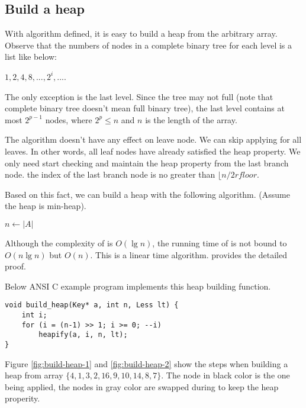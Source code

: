 \documentclass{article}
\begin{document}
\subsection{Build a heap}

With  algorithm defined, it is easy to build a heap from the arbitrary
array. Observe that the numbers of nodes in a complete binary tree
for each level is a list like below:

$1, 2, 4, 8, ..., 2^i, ...$.

The only exception is the last level. Since the tree may not full
(note that complete binary tree doesn't mean full binary tree), the
last level contains at most $2^{p-1}$ nodes, where $2^p \leq n$ and $n$
is the length of the array.

The  algorithm doesn't have any effect on leave node.
We can skip applying  for all leaves. In other words,
all leaf nodes have already satisfied the heap property. We only need
start checking and maintain the heap property from the last branch node.
the index of the last branch node is no greater than $\lfloor n/2 rfloor$.

Based on this fact, we can build a heap with the following algorithm.
(Assume the heap is min-heap).

\begin{algorithmic}[1]
  \State $n \gets |A|$
    \State {}
  \EndFor
\EndFunction
\end{algorithmic}

Although the complexity of  is $O(\lg n)$, the running time
of  is not bound to $O(n \lg n)$ but $O(n)$. This
is a linear time algorithm. \cite{CLRS} provides the detailed proof.

Below ANSI C example program implements this heap building function.

\lstset{language=C}
\begin{lstlisting}
void build_heap(Key* a, int n, Less lt) {
    int i;
    for (i = (n-1) >> 1; i >= 0; --i)
        heapify(a, i, n, lt);
}
\end{lstlisting}

Figure \ref{fig:build-heap-1} and \ref{fig:build-heap-2}
show the steps when building a heap from
array $\{4, 1, 3, 2, 16, 9, 10, 14, 8, 7\}$.
The node in black color is the one  being
applied, the nodes in gray color are swapped during
to keep the heap properity.
\end{document}
